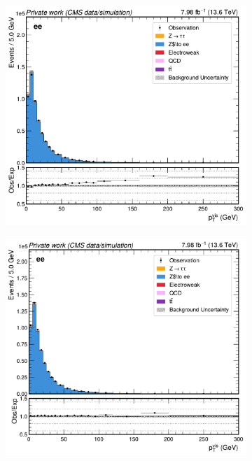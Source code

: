 \begin{figure}[!htbp]
    \label{Figure:Chapter6_ZPT_Reweighting}
\end{figure}

\begin{figure}[!htbp]
        \centering
        \begin{subfigure}[b]{0.49\textwidth}
            \centering
            \includegraphics[width=\textwidth]{Figures/Chapter7/zpt_ee_ptvis_without.pdf}
            \caption{}
        \end{subfigure}
        \begin{subfigure}[b]{0.49\textwidth}
            \centering
            \includegraphics[width=\textwidth]{Figures/Chapter7/zpt_ee_ptvis_with.pdf}

\end{subfigure}
\end{figure}
